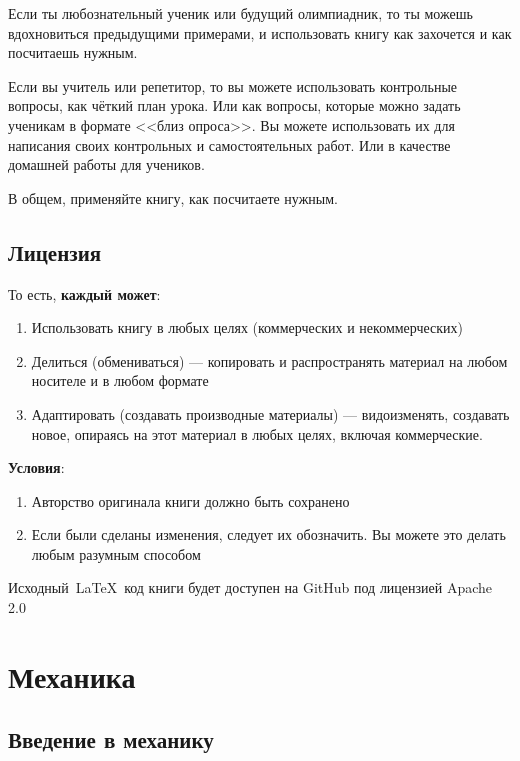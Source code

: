 \documentclass[12pt,a4paper]{report}
\begin{document}
Если ты любознательный ученик или будущий олимпиадник, то ты можешь вдохновиться предыдущими примерами, и использовать книгу как захочется и как посчитаешь нужным.

Если вы учитель или репетитор, то вы можете использовать контрольные вопросы, как чёткий план урока. Или как вопросы, которые можно задать ученикам в формате <<близ опроса>>. Вы можете использовать их для написания своих контрольных и самостоятельных работ. Или в качестве домашней работы для учеников.

В общем, применяйте книгу, как посчитаете нужным.

\chapter*{Лицензия}
\doclicenseThis
То есть, \textbf{каждый может}:
\begin{enumerate}
\item Использовать книгу в любых целях (коммерческих и некоммерческих)
\item Делиться (обмениваться) --- копировать и распространять материал на любом носителе и в любом формате 
\item Адаптировать (создавать производные материалы) --- видоизменять, создавать новое, опираясь на этот материал в любых целях, включая коммерческие.
\end{enumerate}
\textbf{Условия}:
\begin{enumerate}
\item Авторство оригинала книги должно быть сохранено
\item Если были сделаны изменения, следует их обозначить. Вы можете это делать любым разумным способом
\end{enumerate}

Исходный~\LaTeX~код книги будет доступен на GitHub под лицензией Apache 2.0

\part{Механика}
\setcounter{chapter}{-1}

\chapter{Введение в механику}
\end{document}
